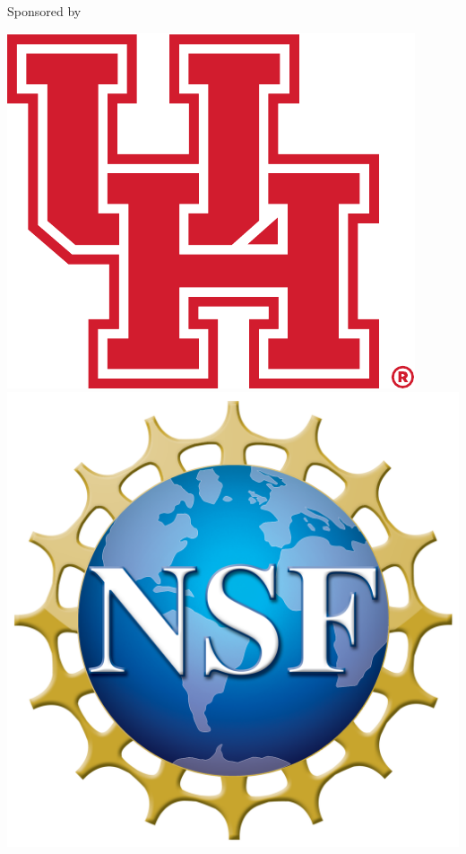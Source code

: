 {{\large Sponsored by}\\[3mm]
\begin{center}
\includegraphics[totalheight = 3cm]{figures/uh.pdf}
\qquad\includegraphics[totalheight = 3cm]{figures/nsf-logo.png}
\end{center}
}

\newpage\newpage
\thispagestyle{empty}
\newpage
\clearpage


